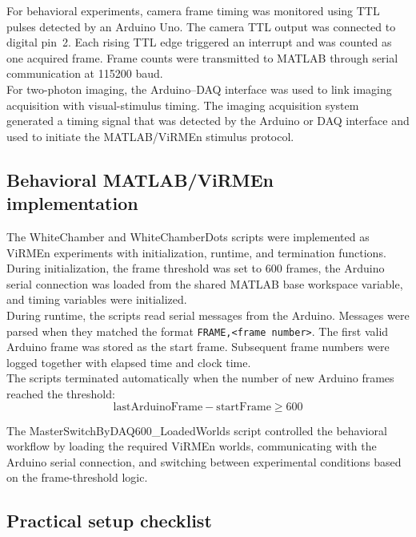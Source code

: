 For behavioral experiments, camera frame timing was monitored using TTL pulses detected by an Arduino Uno. The camera TTL output was connected to digital pin~2. Each rising TTL edge triggered an interrupt and was counted as one acquired frame. Frame counts were transmitted to MATLAB through serial communication at 115200 baud.\\

For two-photon imaging, the Arduino--DAQ interface was used to link imaging acquisition with visual-stimulus timing. The imaging acquisition system generated a timing signal that was detected by the Arduino or DAQ interface and used to initiate the MATLAB/ViRMEn stimulus protocol.\\

\subsection{Behavioral MATLAB/ViRMEn implementation}

The WhiteChamber and WhiteChamberDots scripts were implemented as ViRMEn experiments with initialization, runtime, and termination functions. During initialization, the frame threshold was set to 600 frames, the Arduino serial connection was loaded from the shared MATLAB base workspace variable, and timing variables were initialized.\\

During runtime, the scripts read serial messages from the Arduino. Messages were parsed when they matched the format \texttt{FRAME,<frame number>}. The first valid Arduino frame was stored as the start frame. Subsequent frame numbers were logged together with elapsed time and clock time.\\

The scripts terminated automatically when the number of new Arduino frames reached the threshold:\\

\[
\mathrm{lastArduinoFrame} - \mathrm{startFrame} \geq 600
\]

The MasterSwitchByDAQ600\_LoadedWorlds script controlled the behavioral workflow by loading the required ViRMEn worlds, communicating with the Arduino serial connection, and switching between experimental conditions based on the frame-threshold logic.\\

\subsection{Practical setup checklist}

